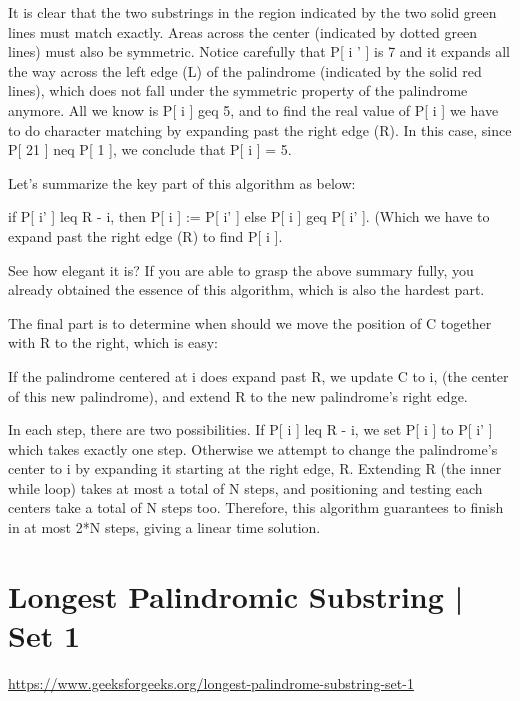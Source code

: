 It is clear that the two substrings in the region indicated by the two solid
green lines must match exactly. Areas across the center (indicated by dotted
green lines) must also be symmetric. Notice carefully that P[ i ' ] is 7 and
it expands all the way across the left edge (L) of the palindrome (indicated
by the solid red lines), which does not fall under the symmetric property of
the palindrome anymore. All we know is P[ i ] geq 5, and to find the real
value of P[ i ] we have to do character matching by expanding past the right
edge (R). In this case, since P[ 21 ] neq P[ 1 ], we conclude that P[ i ] = 5.

Let's summarize the key part of this algorithm as below:

if P[ i' ] leq R - i,
then P[ i ] := P[ i' ]
else P[ i ] geq P[ i' ]. (Which we have to expand past the right edge (R) to find P[ i ].

See how elegant it is? If you are able to grasp the above summary fully, you
already obtained the essence of this algorithm, which is also the hardest
part.

The final part is to determine when should we move the position of C
together with R to the right, which is easy:

If the palindrome centered at i does expand past R, we update C to i, (the
center of this new palindrome), and extend R to the new palindrome's right
edge.

In each step, there are two possibilities. If P[ i ] leq R - i, we set P[ i ]
to P[ i' ] which takes exactly one step. Otherwise we attempt to change the
palindrome's center to i by expanding it starting at the right edge, R.
Extending R (the inner while loop) takes at most a total of N steps, and
positioning and testing each centers take a total of N steps too. Therefore,
this algorithm guarantees to finish in at most 2*N steps, giving a linear
time solution.




\section{Longest Palindromic Substring | Set 1
  \label{secLPSStrGFGLngstPlndrmcSbstrngSet1}}

\url{https://www.geeksforgeeks.org/longest-palindrome-substring-set-1}

